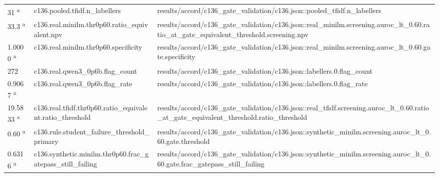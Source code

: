 \begin{longtable}{@{}p{0.7in}p{1.9in}p{2.6in}@{}}
31 \textsuperscript{a} & c136.\allowbreak{}pooled.\allowbreak{}tfidf.\allowbreak{}n\_labellers & results/\allowbreak{}accord/\allowbreak{}c136\_gate\_validation/\allowbreak{}c136.\allowbreak{}json::pooled\_tfidf.\allowbreak{}n\_labellers\\
33.3 \textsuperscript{a} & c136.\allowbreak{}real.\allowbreak{}minilm.\allowbreak{}thr0p60.\allowbreak{}ratio\_equivalent.\allowbreak{}npv & results/\allowbreak{}accord/\allowbreak{}c136\_gate\_validation/\allowbreak{}c136.\allowbreak{}json::real\_minilm.\allowbreak{}screening.\allowbreak{}auroc\_lt\_0.\allowbreak{}60.\allowbreak{}ratio\_at\_gate\_equivalent\_threshold.\allowbreak{}screening.\allowbreak{}npv\\
1.0000 \textsuperscript{a} & c136.\allowbreak{}real.\allowbreak{}minilm.\allowbreak{}thr0p60.\allowbreak{}specificity & results/\allowbreak{}accord/\allowbreak{}c136\_gate\_validation/\allowbreak{}c136.\allowbreak{}json::real\_minilm.\allowbreak{}screening.\allowbreak{}auroc\_lt\_0.\allowbreak{}60.\allowbreak{}gate.\allowbreak{}specificity\\
272 & c136.\allowbreak{}real.\allowbreak{}qwen3\_0p6b.\allowbreak{}flag\_count & results/\allowbreak{}accord/\allowbreak{}c136\_gate\_validation/\allowbreak{}c136.\allowbreak{}json::labellers.\allowbreak{}0.\allowbreak{}flag\_count\\
0.9067 \textsuperscript{a} & c136.\allowbreak{}real.\allowbreak{}qwen3\_0p6b.\allowbreak{}flag\_rate & results/\allowbreak{}accord/\allowbreak{}c136\_gate\_validation/\allowbreak{}c136.\allowbreak{}json::labellers.\allowbreak{}0.\allowbreak{}flag\_rate\\
19.5833 \textsuperscript{a} & c136.\allowbreak{}real.\allowbreak{}tfidf.\allowbreak{}thr0p60.\allowbreak{}ratio\_equivalent.\allowbreak{}ratio\_threshold & results/\allowbreak{}accord/\allowbreak{}c136\_gate\_validation/\allowbreak{}c136.\allowbreak{}json::real\_tfidf.\allowbreak{}screening.\allowbreak{}auroc\_lt\_0.\allowbreak{}60.\allowbreak{}ratio\_at\_gate\_equivalent\_threshold.\allowbreak{}ratio\_threshold\\
0.60 \textsuperscript{a} & c136.\allowbreak{}rule.\allowbreak{}student\_failure\_threshold\_primary & results/\allowbreak{}accord/\allowbreak{}c136\_gate\_validation/\allowbreak{}c136.\allowbreak{}json::synthetic\_minilm.\allowbreak{}screening.\allowbreak{}auroc\_lt\_0.\allowbreak{}60.\allowbreak{}gate.\allowbreak{}threshold\\
0.6316 \textsuperscript{a} & c136.\allowbreak{}synthetic.\allowbreak{}minilm.\allowbreak{}thr0p60.\allowbreak{}frac\_gatepass\_still\_failing & results/\allowbreak{}accord/\allowbreak{}c136\_gate\_validation/\allowbreak{}c136.\allowbreak{}json::synthetic\_minilm.\allowbreak{}screening.\allowbreak{}auroc\_lt\_0.\allowbreak{}60.\allowbreak{}gate.\allowbreak{}frac\_gatepass\_still\_failing\\

\end{longtable}

